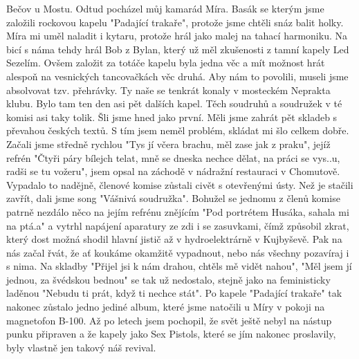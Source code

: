 
Bečov u Mostu. Odtud pocházel můj kamarád Míra. Basák se kterým jsme
založili rockovou kapelu "Padající trakaře", protože jsme chtěli snáz
balit holky. Míra mi uměl naladit i kytaru, protože hrál jako malej na
tahací harmoniku. Na bicí s náma tehdy hrál Bob z Bylan, který už měl
zkušenosti z tamní kapely Led Sezelím. Ovšem založit za totáče kapelu
byla jedna věc a mít možnost hrát alespoň na vesnických tancovačkách
věc druhá. Aby nám to povolili, museli jsme absolvovat tzv. přehrávky.
Ty naše se tenkrát konaly v mosteckém Neprakta klubu. Bylo tam ten den
asi pět dalších kapel. Těch soudruhů a soudružek v té komisi asi taky
tolik. Šli jsme hned jako první. Měli jsme zahrát pět skladeb s
převahou českých textů. S tím jsem neměl problém, skládat mi šlo
celkem dobře. Začali jsme středně rychlou "Tys jí včera brachu, měl
zase jak z praku", jejíž refrén "Čtyři páry bílejch telat, mně se
dneska nechce dělat, na práci se vys..u, radši se tu vožeru", jsem
opsal na záchodě v nádražní restauraci v Chomutově. Vypadalo to
nadějně, členové komise zůstali civět s otevřenými ústy. Než je
stačili zavřít, dali jsme song "Vášnivá soudružka". Bohužel se jednomu
z členů komise patrně nezdálo něco na jejím refrénu znějícím "Pod
portrétem Husáka, sahala mi na ptá.a" a vytrhl napájení aparatury ze
zdi i se zasuvkami, čímž způsobil zkrat, který dost možná shodil
hlavní jistič až v hydroelektrárně v Kujbyševě. Pak na nás začal řvát,
že ať koukáme okamžitě vypadnout, nebo nás všechny pozavíraj i s
nima. Na skladby "Přijel jsi k nám drahou, chtěls mě vidět nahou",
"Měl jsem jí jednou, za švédskou bednou" se tak už nedostalo, stejně
jako na feministicky laděnou "Nebudu ti prát, když ti nechce stát". Po
kapele "Padající trakaře" tak nakonec zůstalo jedno jediné album,
které jsme natočili u Míry v pokoji na magnetofon B-100. Až po letech
jsem pochopil, že svět ještě nebyl na nástup punku připraven a že
kapely jako Sex Pistols, které se jím nakonec proslavily, byly vlastně
jen takový náš revival.
